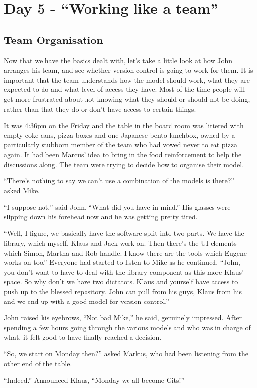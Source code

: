 \section{Day 5 - ``Working like a team''}
\subsection{Team Organisation}
Now that we have the basics dealt with, let's take a little look at how John arranges his team, and see whether version control is going to work for them.
It is important that the team understands how the model should work, what they are expected to do and what level of access they have.
Most of the time people will get more frustrated about not knowing what they should or should not be doing, rather than that they do or don't have access to certain things.

\begin{trenches}
It was 4:36pm on the Friday and the table in the board room was littered with empty coke cans, pizza boxes and one Japanese bento lunchbox, owned by a particularly stubborn member of the team who had vowed never to eat pizza again.
It had been Marcus' idea to bring in the food reinforcement to help the discussions along.
The team were trying to decide how to organise their model.

``There's nothing to say we can't use a combination of the models is there?'' asked Mike.

``I suppose not,'' said John.
``What did you have in mind.'' His glasses were slipping down his forehead now and he was getting pretty tired.

``Well, I figure, we basically have the software split into two parts. We have the library, which myself, Klaus and Jack work on. Then there's the UI elements which Simon, Martha and Rob handle. I know there are the tools which Eugene works on too.''
Everyone had started to listen to Mike as he continued.
``John, you don't want to have to deal with the library component as this more Klaus' space. So why don't we have two dictators. Klaus and yourself have access to push up to the blessed repository. John can pull from his guys, Klaus from his and we end up with a good model for version control.''

John raised his eyebrows, ``Not bad Mike,'' he said, genuinely impressed.
After spending a few hours going through the various models and who was in charge of what, it felt good to have finally reached a decision.

``So, we start on Monday then?'' asked Markus, who had been listening from the other end of the table.

``Indeed.'' Announced Klaus, ``Monday we all become Gits!''
\end{trenches}
